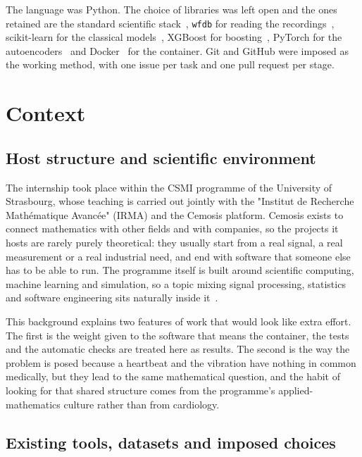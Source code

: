 \documentclass[a4paper, 12pt]{article}
\begin{document}
The language was Python. The choice of libraries was left open and the ones 
retained are the standard scientific stack~\cite{harris2020numpy, virtanen2020scipy, mckinney2010pandas,
hunter2007matplotlib}, \texttt{wfdb} for reading the recordings~\cite{wfdbpython}, 
scikit-learn for the classical models~\cite{pedregosa2011sklearn}, XGBoost for 
boosting~\cite{chen2016xgboost}, PyTorch for the autoencoders~\cite{paszke2019pytorch} and
Docker~\cite{merkel2014docker} for the container. Git and GitHub were imposed as
the working method, with one issue per task and one pull request per stage.




\section{Context} \label{sec:context}


\subsection{Host structure and scientific environment}\label{subsec:host}

The internship took place within the CSMI programme of the University of
Strasbourg, whose teaching is carried out jointly with the "Institut de Recherche
Mathématique Avancée" (IRMA) and the Cemosis platform. Cemosis exists to connect
mathematics with other fields and with companies, so the projects it hosts are
rarely purely theoretical: they usually start from a real signal, a real
measurement or a real industrial need, and end with software that someone else
has to be able to run. The programme itself is built around scientific computing,
machine learning and simulation, so a topic mixing signal processing, statistics
and software engineering sits naturally inside it~\cite{csmiguide}.

This background explains two features of work that would look like extra effort. 
The first is the weight given to the software that means the container, the tests
and the automatic checks are treated here as results. The second is the way the 
problem is posed because a heartbeat and the vibration have nothing in 
common medically, but they lead to the same mathematical question, and the habit 
of looking for that shared structure comes from the programme's applied-mathematics 
culture rather than from cardiology.



\subsection{Existing tools, datasets and imposed choices}\label{subsec:existing}
\end{document}

